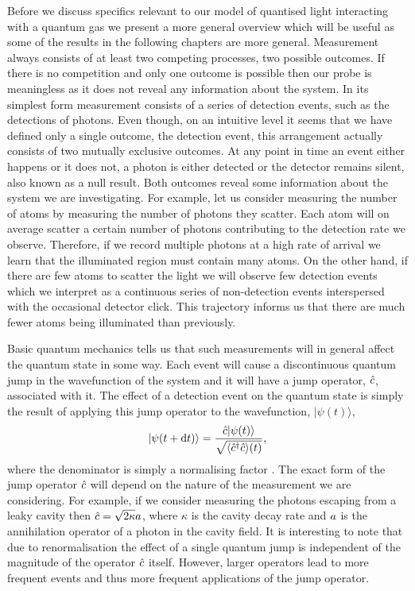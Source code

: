 Before we discuss specifics relevant to our model of quantised light
interacting with a quantum gas we present a more general overview
which will be useful as some of the results in the following chapters
are more general. Measurement always consists of at least two
competing processes, two possible outcomes. If there is no competition
and only one outcome is possible then our probe is meaningless as it
does not reveal any information about the system. In its simplest form
measurement consists of a series of detection events, such as the
detections of photons. Even though, on an intuitive level it seems
that we have defined only a single outcome, the detection event, this
arrangement actually consists of two mutually exclusive outcomes. At
any point in time an event either happens or it does not, a photon is
either detected or the detector remains silent, also known as a null
result. Both outcomes reveal some information about the system we are
investigating. For example, let us consider measuring the number of
atoms by measuring the number of photons they scatter. Each atom will
on average scatter a certain number of photons contributing to the
detection rate we observe. Therefore, if we record multiple photons at
a high rate of arrival we learn that the illuminated region must
contain many atoms. On the other hand, if there are few atoms to
scatter the light we will observe few detection events which we
interpret as a continuous series of non-detection events interspersed
with the occasional detector click. This trajectory informs us that
there are much fewer atoms being illuminated than previously.

Basic quantum mechanics tells us that such measurements will in
general affect the quantum state in some way. Each event will cause a
discontinuous quantum jump in the wavefunction of the system and it
will have a jump operator, $\hat{c}$, associated with it. The effect of a
detection event on the quantum state is simply the result of applying
this jump operator to the wavefunction, $| \psi (t) \rangle$,
\begin{equation}
  \label{eq:jump}
  | \psi(t + \mathrm{d}t) \rangle = \frac{\hat{c} | \psi(t) \rangle}
  {\sqrt{\langle \hat{c}^\dagger \hat{c} \rangle (t)}},
\end{equation}
where the denominator is simply a normalising factor
\cite{MeasurementControl}. The exact form of the jump operator $\hat{c}$
will depend on the nature of the measurement we are considering. For
example, if we consider measuring the photons escaping from a leaky
cavity then $\hat{c} = \sqrt{2 \kappa} a$, where $\kappa$ is the
cavity decay rate and $a$ is the annihilation operator of a
photon in the cavity field. It is interesting to note that due to
renormalisation the effect of a single quantum jump is independent of
the magnitude of the operator $\hat{c}$ itself. However, larger operators
lead to more frequent events and thus more frequent applications of
the jump operator.

